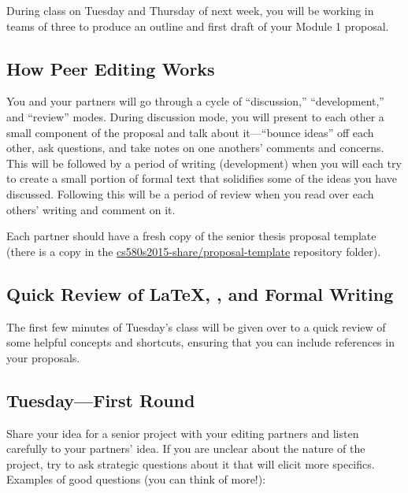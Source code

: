 

\usepackage[compact]{titlesec}




During class on Tuesday and Thursday of next week, you will be working in teams of three to produce an outline and first
draft of your Module 1 proposal.

\subsection*{How Peer Editing Works}

You and your partners will go through a cycle of ``discussion,'' ``development,'' and ``review''  modes.  During
discussion mode, you will present to each other a small component of the proposal and talk about it---``bounce ideas''
off each other, ask questions, and take notes on one anothers' comments and concerns.  This will be followed by a period
of writing (development) when you will each try to create a small portion of formal text that solidifies some of the
ideas you have discussed.  Following this will be a period of review when you read over each others' writing and comment
on it.

Each partner should have a fresh copy of the senior thesis proposal template
(there is a copy in the \url{cs580s2015-share/proposal-template} repository
folder).

\subsection*{Quick Review of \LaTeX, \BibTeX, and Formal Writing}

The first few minutes of Tuesday's class will be given over to a quick review of some helpful concepts and shortcuts,
ensuring that you can include references in your proposals.

\subsection*{Tuesday---First Round}

 Share your idea for a senior project with your editing
partners and listen carefully to your partners' idea. If you are unclear about
the nature of the project, try to ask strategic questions about it that will
elicit more specifics. Examples of good questions (you can think of more!):


